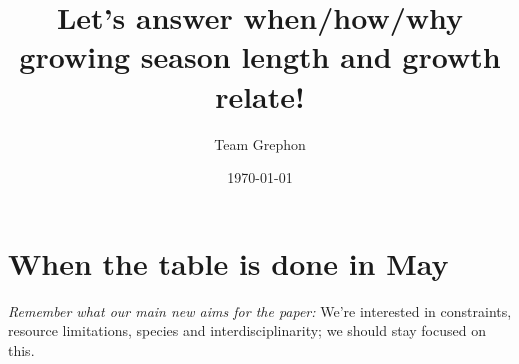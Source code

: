 \documentclass[11pt,letter]{article}
\begin{document}

\renewcommand{\refname}{\CHead{}}

\title{Let's answer when/how/why growing season length and growth relate!}
\author{Team Grephon}
\date{\today}
\maketitle

\tableofcontents


\section{When the table is done in May}

\emph{Remember what our main new aims for the paper:}
We're interested in constraints, resource limitations, species and interdisciplinarity; we should stay focused on this.
\end{document}

